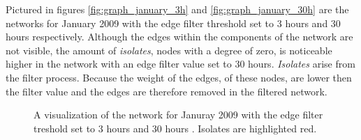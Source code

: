 Pictured in figures \ref{fig:graph_january_3h} and  \ref{fig:graph_january_30h} are the networks for January 2009 with the edge filter threshold set to 3 hours and 30 hours respectively. Although the edges within the components of the network are not visible, the amount of \textit{isolates}, nodes with a degree of zero, is noticeable higher in the network with an edge filter value set to 30 hours. \textit{Isolates} arise from the filter process. Because the weight of the edges, of these nodes, are lower then the filter value and the edges are therefore removed in the filtered network.   

\begin{figure}[htpb]%
	\centering 
	\qquad 
	\caption[Network visualizations with different edge filter values]{A visualization of the network for Januray 2009 with the edge filter treshold set to 3 hours  and 30 hours . Isolates are highlighted red.} 
	 
\end{figure}    

